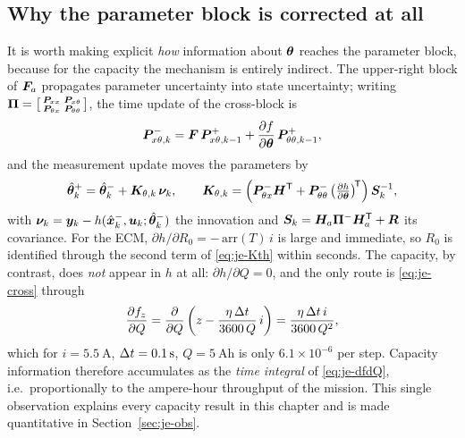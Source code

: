 \subsection{Why the parameter block is corrected at all}
It is worth making explicit \emph{how} information about $\bm{\theta}$ reaches the parameter block,
because for the capacity the mechanism is entirely indirect.  The upper-right block of $\bm{F}_a$
propagates parameter uncertainty into state uncertainty; writing
$\bm{\Pi}=\begin{bsmallmatrix}\bm{P}_{xx}&\bm{P}_{x\theta}\\ \bm{P}_{\theta x}&\bm{P}_{\theta\theta}\end{bsmallmatrix}$,
the time update of the cross-block is
\begin{equation}
\bm{P}^-_{x\theta,k}=\bm{F}\,\bm{P}^+_{x\theta,k-1}+\frac{\partial f}{\partial\bm{\theta}}\,\bm{P}^+_{\theta\theta,k-1},
\label{eq:je-cross}
\end{equation}
and the measurement update moves the parameters by
\begin{equation}
\hat{\bm{\theta}}^+_k=\hat{\bm{\theta}}^-_k+\bm{K}_{\theta,k}\,\bm{\nu}_k,\qquad
\bm{K}_{\theta,k}=\left(\bm{P}^-_{\theta x}\bm{H}^{\mathsf{T}}+\bm{P}^-_{\theta\theta}\left(\tfrac{\partial h}{\partial\bm{\theta}}\right)^{\!\mathsf{T}}\right)\bm{S}_k^{-1} ,
\label{eq:je-Kth}
\end{equation}
with $\bm{\nu}_k=\bm{y}_k-h(\hat{\bm{x}}^-_k,\bm{u}_k;\hat{\bm{\theta}}^-_k)$ the innovation and
$\bm{S}_k=\bm{H}_a\bm{\Pi}^-\bm{H}_a^{\mathsf{T}}+\bm{R}$ its covariance.  For the ECM,
$\partial h/\partial R_0 = -\,\mathrm{arr}(T)\,i$ is large and immediate, so $R_0$ is identified
through the second term of \eqref{eq:je-Kth} within seconds.  The capacity, by contrast, does
\emph{not} appear in $h$ at all: $\partial h/\partial Q=0$, and the only route is
\eqref{eq:je-cross} through
\begin{equation}
\frac{\partial f_z}{\partial Q}
=\frac{\partial}{\partial Q}\left(z-\frac{\eta\,\Delta t}{3600\,Q}\,i\right)
=\frac{\eta\,\Delta t\, i}{3600\,Q^2},
\label{eq:je-dfdQ}
\end{equation}
which for $i=\SI{5.5}{\ampere}$, $\Delta t=\SI{0.1}{\second}$, $Q=\SI{5}{\ampere\hour}$ is only
$6.1\times10^{-6}$ per step.  Capacity information therefore accumulates as the \emph{time
integral} of \eqref{eq:je-dfdQ}, i.e.\ proportionally to the ampere-hour throughput of the mission.
This single observation explains every capacity result in this chapter and is made quantitative in
Section~\ref{sec:je-obs}.

